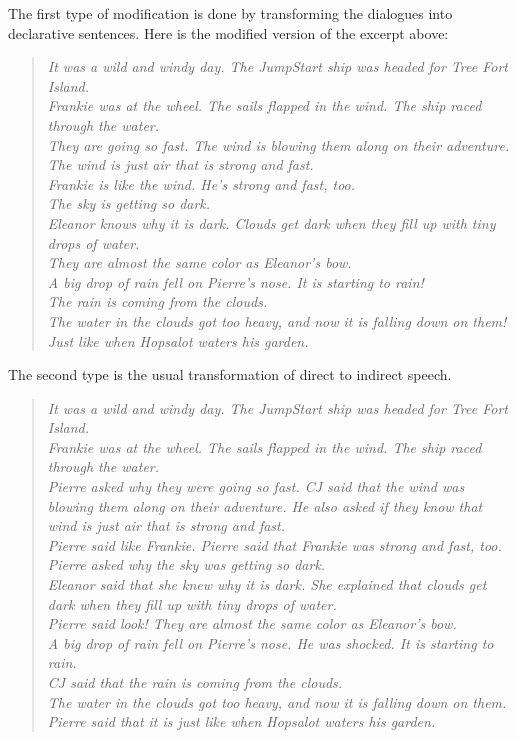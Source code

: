 The first type of modification is done by transforming the dialogues into declarative sentences. Here is the modified version of the excerpt above:

\begin{verse}
\itshape
It was a wild and windy day. The JumpStart ship was headed for Tree Fort Island. \\
Frankie was at the wheel. The sails flapped in the wind. The ship raced through the water. \\
They are going so fast. The wind is blowing them along on their adventure. The wind is just air that is strong and fast. \\
Frankie is like the wind. He's strong and fast, too. \\
The sky is getting so dark.\\
Eleanor knows why it is dark. Clouds get dark when they fill up with tiny drops of water. \\
They are almost the same color as Eleanor's bow. \\
A big drop of rain fell on Pierre's nose. It is starting to rain! \\
The rain is coming from the clouds. \\
The water in the clouds got too heavy, and now it is falling down on them! \\
Just like when Hopsalot waters his garden. \\
\end{verse}

The second type is the usual transformation of direct to indirect speech. 

\begin{verse}
\itshape
It was a wild and windy day. The JumpStart ship was headed for Tree Fort Island. \\
Frankie was at the wheel. The sails flapped in the wind. The ship raced through the water. \\
Pierre asked why they were going so fast. CJ said that the wind was blowing them along on their adventure. He also asked if they know that wind is just air that is strong and fast. \\
Pierre said like Frankie. Pierre said that Frankie was strong and fast, too. \\
Pierre asked why the sky was getting so dark.\\
Eleanor said that she knew why it is dark. She explained that clouds get dark when they fill up with tiny drops of water.\\
Pierre said look! They are almost the same color as Eleanor's bow. \\
A big drop of rain fell on Pierre's nose. He was shocked. It is starting to rain. \\
CJ said that the rain is coming from the clouds. \\
The water in the clouds got too heavy, and now it is falling down on them. \\
Pierre said that it is just like when Hopsalot waters his garden. \\
\end{verse}
	
